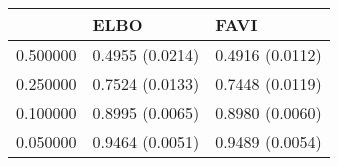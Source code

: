 \begin{tabular}{lll}
\toprule
 & ELBO & FAVI \\
\midrule
0.500000 & 0.4955 (0.0214) & 0.4916 (0.0112) \\
0.250000 & 0.7524 (0.0133) & 0.7448 (0.0119) \\
0.100000 & 0.8995 (0.0065) & 0.8980 (0.0060) \\
0.050000 & 0.9464 (0.0051) & 0.9489 (0.0054) \\
\bottomrule
\end{tabular}

